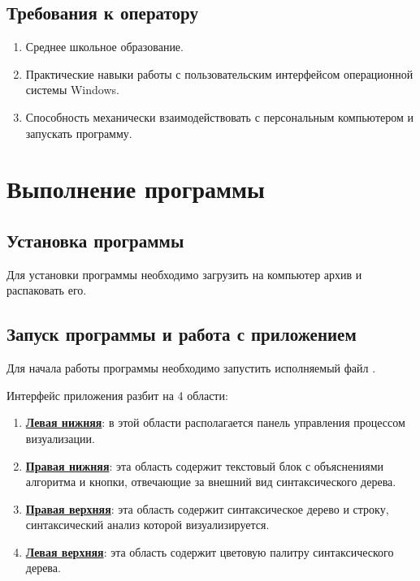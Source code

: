 \documentclass[a4paper,12pt]{article}
\begin{document}
  \subsection{Требования к оператору} %
  \begin{enumerate}
    \item Среднее школьное образование.
    \item Практические навыки работы с пользовательским интерфейсом операционной системы Windows.
    \item Способность механически взаимодействовать с персональным компьютером и запускать программу.
  \end{enumerate}


  \newpage
  \section{Выполнение программы}
  \subsection{Установка программы}
  Для установки программы необходимо загрузить на компьютер архив \CRTzip{} и распаковать его.

  \subsection{Запуск программы и работа с приложением}
  Для начала работы программы необходимо запустить исполняемый файл \CRTexe{}.

  Интерфейс приложения разбит на 4 области: 
  \begin{enumerate}
    \item \hyperref[sec:a1]{\textbf{Левая нижняя}}: в этой области располагается панель управления процессом визуализации.
    \item \hyperref[sec:a2]{\textbf{Правая нижняя}}: эта область содержит текстовый блок с объяснениями алгоритма и кнопки, отвечающие за внешний вид синтаксического дерева.
    \item \hyperref[sec:a3]{\textbf{Правая верхняя}}: эта область содержит синтаксическое дерево и строку, синтаксический анализ которой визуализируется.
    \item \hyperref[sec:a4]{\textbf{Левая верхняя}}: эта область содержит цветовую палитру синтаксического дерева.
  \end{enumerate}
\end{document}
